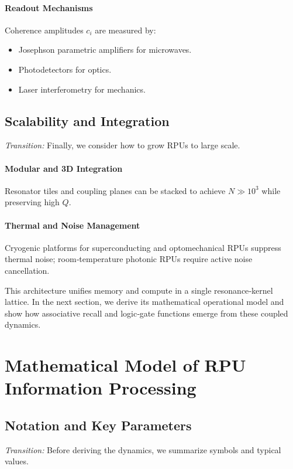 \paragraph{Readout Mechanisms}  
Coherence amplitudes \(c_i\) are measured by:
\begin{itemize}
  \item Josephson parametric amplifiers for microwaves.
  \item Photodetectors for optics.
  \item Laser interferometry for mechanics.
\end{itemize}

\subsection{Scalability and Integration}
\emph{Transition:} Finally, we consider how to grow RPUs to large scale.

\paragraph{Modular and 3D Integration}
Resonator tiles and coupling planes can be stacked to achieve \(N\gg10^3\) while preserving high \(Q\).

\paragraph{Thermal and Noise Management}
Cryogenic platforms for superconducting and optomechanical RPUs suppress thermal noise; room‐temperature photonic RPUs require active noise cancellation.

This architecture unifies memory and compute in a single resonance‐kernel lattice.  In the next section, we derive its mathematical operational model and show how associative recall and logic‐gate functions emerge from these coupled dynamics.


\section{Mathematical Model of RPU Information Processing}

\subsection{Notation and Key Parameters}
\emph{Transition:} Before deriving the dynamics, we summarize symbols and typical values.

